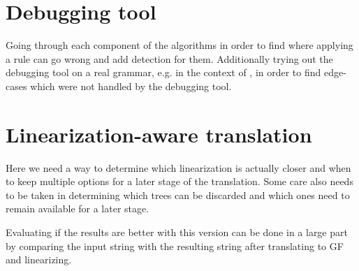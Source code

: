 \section{Debugging tool}
Going through each component of the algorithms in order to find where applying a rule can go wrong and add detection for them. Additionally trying out the debugging tool on a real grammar, e.g. in the context of \cite{listenmaa-etal-2021-towards}, in order to find edge-cases which were not handled by the debugging tool.


\section{Linearization-aware translation}
Here we need a way to determine which linearization is actually closer and when to keep multiple options for a later stage of the translation. Some care also needs to be taken in determining which trees can be discarded and which ones need to remain available for a later stage.

Evaluating if the results are better with this version can be done in a large part by comparing the input string with the resulting string after translating to GF and linearizing.
